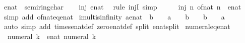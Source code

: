 \begin{isabellebody}
%
\endisatagproof
{\isafoldproof}%
%
\isadelimproof
\isanewline
%
\endisadelimproof
\isanewline
{}\isamarkupfalse%
\ enat\ {\isacharcolon}{\isacharcolon}\ semiring{\isacharunderscore}char{\isacharunderscore}{}\isanewline
%
\isadelimproof
%
\endisadelimproof
%
\isatagproof
{}\isamarkupfalse%
\isanewline
\ \ \isamarkupfalse%
\ {\isachardoublequoteopen}inj\ enat{\isachardoublequoteclose}\ \isamarkupfalse%
\ {\isacharparenleft}rule\ injI{\isacharparenright}\ simp\isanewline
\ \ \isamarkupfalse%
\ \isamarkupfalse%
\ {\isachardoublequoteopen}inj\ {\isacharparenleft}{\isasymlambda}n{\isachardot}\ of{\isacharunderscore}nat\ n\ {\isacharcolon}{\isacharcolon}\ enat{\isacharparenright}{\isachardoublequoteclose}\ \isamarkupfalse%
\ {\isacharparenleft}simp\ add{\isacharcolon}\ of{\isacharunderscore}nat{\isacharunderscore}eq{\isacharunderscore}enat{\isacharparenright}\isanewline
{}\isamarkupfalse%
%
\endisatagproof
{\isafoldproof}%
%
\isadelimproof
\isanewline
%
\endisadelimproof
\isanewline
{}\isamarkupfalse%
\ imult{\isacharunderscore}is{\isacharunderscore}infinity{\isacharcolon}\ {\isachardoublequoteopen}{\isacharparenleft}{\isacharparenleft}a{\isacharcolon}{\isacharcolon}enat{\isacharparenright}\ {\isacharasterisk}\ b\ {\isacharequal}\ {\isasyminfinity}{\isacharparenright}\ {\isacharequal}\ {\isacharparenleft}a\ {\isacharequal}\ {\isasyminfinity}\ {\isasymand}\ b\ {\isasymnoteq}\ {}\ {\isasymor}\ b\ {\isacharequal}\ {\isasyminfinity}\ {\isasymand}\ a\ {\isasymnoteq}\ {}{\isacharparenright}{\isachardoublequoteclose}\isanewline
%
\isadelimproof
\ \ %
\endisadelimproof
%
\isatagproof
{}\isamarkupfalse%
\ {\isacharparenleft}auto\ simp\ add{\isacharcolon}\ times{\isacharunderscore}enat{\isacharunderscore}def\ zero{\isacharunderscore}enat{\isacharunderscore}def\ split{\isacharcolon}\ enat{\isachardot}split{\isacharparenright}%
\endisatagproof
{\isafoldproof}%
%
\isadelimproof
%
\endisadelimproof
%
\isadelimdocument
%
\endisadelimdocument
%
\isatagdocument
%
\isamarkuptrue%
%
\endisatagdocument
{\isafolddocument}%
%
\isadelimdocument
%
\endisadelimdocument
{}\isamarkupfalse%
\ numeral{\isacharunderscore}eq{\isacharunderscore}enat{\isacharcolon}\isanewline
\ \ {\isachardoublequoteopen}numeral\ k\ {\isacharequal}\ enat\ {\isacharparenleft}numeral\ k{\isacharparenright}{\isachardoublequoteclose}\isanewline
%
\isadelimproof
\ \ %
\endisadelimproof

\end{isabellebody}
